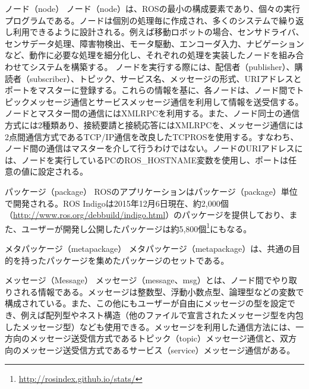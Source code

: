 \begin{term}{ノード（node）}
ノード（node）は、ROSの最小の構成要素であり、個々の実行プログラムである。ノードは個別の処理毎に作成され、多くのシステムで繰り返し利用できるように設計される。例えば移動ロボットの場合、センサドライバ、センサデータ処理、障害物検出、モータ駆動、エンコーダ入力、ナビゲーションなど、動作に必要な処理を細分化し、それぞれの処理を実装したノードを組み合わせてシステムを構築する。
ノードを実行する際には、配信者（publisher）、購読者（subscriber）、トピック、サービス名、メッセージの形式、URIアドレスとポートをマスターに登録する。これらの情報を基に、各ノードは、ノード間でトピックメッセージ通信とサービスメッセージ通信を利用して情報を送受信する。
ノードとマスター間の通信にはXMLRPCを利用する。また、ノード同士の通信方式には2種類あり、接続要請と接続応答にはXMLRPCを、メッセージ通信には2点間通信方式であるTCP/IP通信を改良したTCPROSを使用する。すなわち、ノード間の通信はマスターを介して行うわけではない。ノードのURIアドレスには、ノードを実行しているPCのROS\_HOSTNAME変数を使用し、ポートは任意の値に設定される。
\end{term}


\begin{term}{パッケージ（package）}
ROSのアプリケーションはパッケージ（package）単位で開発される。ROS Indigoは2015年12月6日現在、約2,000個（\url{http://www.ros.org/debbuild/indigo.html}）のパッケージを提供しており、また、ユーザーが開発し公開したパッケージは約5,800個\footnote{\url{http://rosindex.github.io/stats/}}にもなる。
\end{term}


\begin{term}{メタパッケージ（metapackage）}
メタパッケージ（metapackage）は、共通の目的を持ったパッケージを集めたパッケージのセットである。
\end{term}


\begin{term}{メッセージ（Message）}
メッセージ（message、msg）とは、ノード間でやり取りされる情報である。メッセージは整数型、浮動小数点型、論理型などの変数で構成されている。また、この他にもユーザーが自由にメッセージの型を設定でき、例えば配列型やネスト構造（他のファイルで宣言されたメッセージ型を内包したメッセージ型）なども使用できる。メッセージを利用した通信方法には、一方向のメッセージ送受信方式であるトピック（topic）メッセージ通信と、双方向のメッセージ送受信方式であるサービス（service）メッセージ通信がある。
\end{term}

